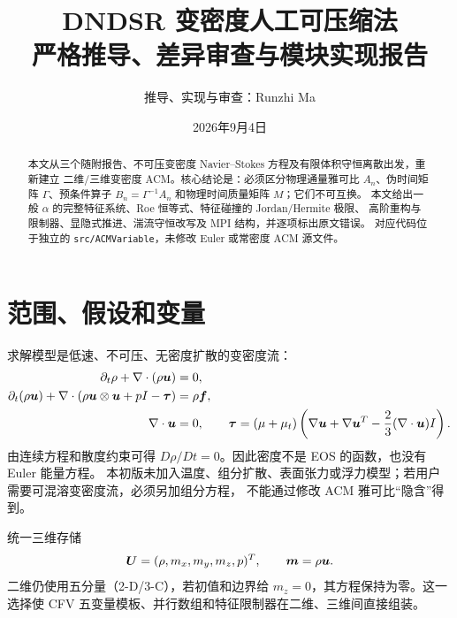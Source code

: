 \documentclass[UTF8,11pt,a4paper]{ctexart}
\title{\bfseries DNDSR 变密度人工可压缩法\\严格推导、差异审查与模块实现报告}
\author{推导、实现与审查：Runzhi Ma}\date{2026年9月4日}
\begin{document}
\maketitle
\begin{abstract}
本文从三个随附报告、不可压变密度 Navier--Stokes 方程及有限体积守恒离散出发，重新建立
二维/三维变密度 ACM。核心结论是：必须区分物理通量雅可比 $A_n$、伪时间矩阵
$\Gamma$、预条件算子 $B_n=\Gamma^{-1}A_n$ 和物理时间质量矩阵 $M$；它们不可互换。
本文给出一般 $\alpha$ 的完整特征系统、Roe 恒等式、特征碰撞的 Jordan/Hermite 极限、
高阶重构与限制器、显隐式推进、湍流守恒改写及 MPI 结构，并逐项标出原文错误。
对应代码位于独立的 \texttt{src/ACMVariable}，未修改 Euler 或常密度 ACM 源文件。
\end{abstract}
\tableofcontents\newpage

\section{范围、假设和变量}
求解模型是低速、不可压、无密度扩散的变密度流：
\begin{align}
 \partial_t\rho+\nabla\cdot(\rho\bm{u})&=0,\\
 \partial_t(\rho\bm{u})+\nabla\cdot(\rho\bm{u}\otimes\bm{u}+pI-\bm{\tau})&=\rho\bm{f},\\
 \nabla\cdot\bm{u}&=0,\qquad
 \bm{\tau}=(\mu+\mu_t)\left(\nabla\bm{u}+\nabla\bm{u}^T-\frac{2}{3}(\nabla\cdot\bm{u})I\right).
\end{align}
由连续方程和散度约束可得 $D\rho/Dt=0$。因此密度不是 EOS 的函数，也没有 Euler 能量方程。
本初版未加入温度、组分扩散、表面张力或浮力模型；若用户需要可混溶变密度流，必须另加组分方程，
不能通过修改 ACM 雅可比“隐含”得到。

统一三维存储
\[\bm{U}=(\rho,m_x,m_y,m_z,p)^T,\qquad \bm{m}=\rho\bm{u}.\]
二维仍使用五分量（2-D/3-C），若初值和边界给 $m_z=0$，其方程保持为零。这一选择使 CFV
五变量模板、并行数组和特征限制器在二维、三维间直接组装。
\end{document}
